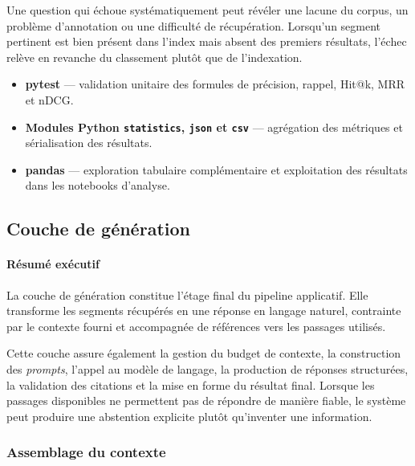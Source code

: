 Une question qui échoue systématiquement peut révéler une lacune du corpus, un
problème d'annotation ou une difficulté de récupération. Lorsqu'un segment pertinent
est bien présent dans l'index mais absent des premiers résultats, l'échec relève en
revanche du classement plutôt que de l'indexation.

\begin{encadre}
\begin{itemize}
  \item \textbf{pytest} — validation unitaire des formules de précision, rappel,
        Hit@k, MRR et nDCG.
  \item \textbf{Modules Python \texttt{statistics}, \texttt{json} et \texttt{csv}} —
        agrégation des métriques et sérialisation des résultats.
  \item \textbf{pandas} — exploration tabulaire complémentaire et exploitation des
        résultats dans les notebooks d'analyse.
\end{itemize}
\end{encadre}

\subsection{Couche de génération}

\paragraph{Résumé exécutif}

La couche de génération constitue l'étage final du pipeline applicatif. Elle
transforme les segments récupérés en une réponse en langage naturel, contrainte par
le contexte fourni et accompagnée de références vers les passages utilisés.

Cette couche assure également la gestion du budget de contexte, la construction des
\emph{prompts}, l'appel au modèle de langage, la production de réponses structurées,
la validation des citations et la mise en forme du résultat final. Lorsque les
passages disponibles ne permettent pas de répondre de manière fiable, le système peut
produire une abstention explicite plutôt qu'inventer une information.

\subsubsection{Assemblage du contexte}

